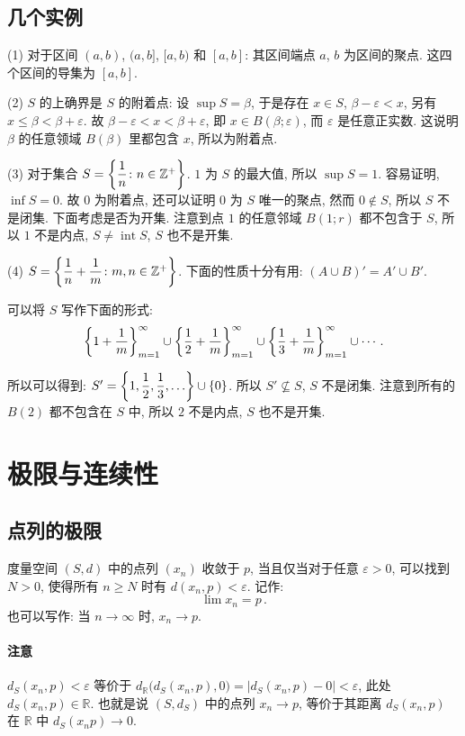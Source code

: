 \documentclass[UTF8]{ctexart}
\theoremstyle{mystyle}
\newcommand{\R}{\mathbb R}
\newcommand{\Z}{\mathbb Z}
\DeclarePairedDelimiter\set{\lbrace}{\rbrace}
\renewcommand{\epsilon}{\varepsilon}
\DeclareMathOperator{\interior}{int}
\begin{document}
\subsection{几个实例}
(1) 对于区间 $ (a, b) $, $ (a, b] $, $ [a, b) $ 和 $ [a, b] $: 其区间端点 $ a $, $ b $ 为区间的聚点. 这四个区间的导集为 $ [a, b] $.

(2) $ S $ 的上确界是 $ S $ 的附着点: 设 $ \sup S = \beta $, 于是存在 $ x \in S $, $ \beta - \epsilon < x $, 另有 $ x \leqslant \beta < \beta + \epsilon $. 故 $ \beta - \epsilon < x < \beta + \epsilon $, 即 $ x \in B(\beta; \epsilon) $, 而 $ \epsilon $ 是任意正实数. 这说明 $ \beta $ 的任意领域 $ B(\beta) $ 里都包含 $ x $, 所以为附着点.

(3) 对于集合 $ S = \set*{\dfrac{1}{n} \colon n \in \Z^+} $. $ 1 $ 为 $ S $ 的最大值, 所以 $ \sup S = 1 $. 容易证明, $ \inf S = 0 $. 故 $ 0 $ 为附着点, 还可以证明 $ 0 $ 为 $ S $ 唯一的聚点, 然而 $ 0 \notin S $, 所以 $ S $ 不是闭集. 下面考虑是否为开集. 注意到点 $ 1 $ 的任意邻域 $ B(1; r) $ 都不包含于 $ S $, 所以 $ 1 $ 不是内点, $ S \neq \interior S $, $ S $ 也不是开集.

(4) $ S = \set*{\dfrac{1}{n} + \dfrac{1}{m} \colon m, n \in \Z^+} $. 下面的性质十分有用: $ (A \cup B)' = A' \cup B' $.

可以将 $ S $ 写作下面的形式:
\[ \set*{1 + \dfrac{1}{m}}_{m = 1}^\infty \cup \set*{\dfrac{1}{2} + \dfrac{1}{m}}_{m = 1}^\infty \cup \set*{\dfrac{1}{3} + \dfrac{1}{m}}_{m = 1}^\infty \cup \cdots \,.\]

所以可以得到: $ S' = \set*{1, \dfrac{1}{2}, \dfrac{1}{3}, \dots} \cup \set{0} $. 所以 $ S' \not\subseteq S $, $ S $ 不是闭集. 注意到所有的 $ B(2) $ 都不包含在 $ S $ 中, 所以 $ 2 $ 不是内点, $ S $ 也不是开集.


\section{极限与连续性}
\subsection{点列的极限}
\begin{definition}
    度量空间 $ (S, d) $ 中的点列 $ (x_n) $ 收敛于 $ p $, 当且仅当对于任意 $ \epsilon > 0 $, 可以找到 $ N > 0 $, 使得所有 $ n \geqslant N $ 时有 $ d(x_n, p) < \epsilon $. 记作: \[ \lim x_n = p \,.\]也可以写作: 当 $ n \to \infty $ 时, $ x_n \to p $.
\end{definition}

\paragraph{注意}
$ d_S (x_n, p) < \epsilon $ 等价于 $ d_\R \big( d_S(x_n, p), 0 \big) = |d_S(x_n, p)- 0| < \epsilon $, 此处 $ d_S(x_n, p) \in \R $. 也就是说 $ (S, d_S) $ 中的点列 $ x_n \to p $, 等价于其距离 $ d_S(x_n, p) $ 在 $ \R $ 中 $ d_S(x_n p) \to 0 $.
\end{document}
